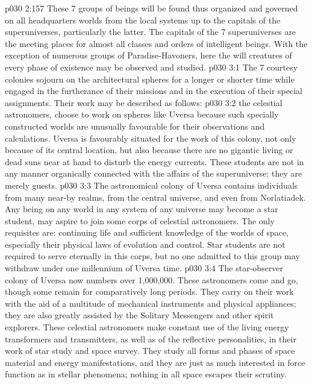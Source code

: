 \vs p030 2:157 \pc These 7 groups of beings will be found thus organized and governed on all headquarters worlds from the local systems up to the capitals of the superuniverses, particularly the latter. The capitals of the 7 superuniverses are the meeting places for almost all classes and orders of intelligent beings. With the exception of numerous groups of Paradise\hyp{}Havoners, here the will creatures of every phase of existence may be observed and studied.
\vs p030 3:1 The 7 courtesy colonies sojourn on the architectural spheres for a longer or shorter time while engaged in the furtherance of their missions and in the execution of their special assignments. Their work may be described as follows:
\vs p030 3:2 \bibnobreakspace {} the celestial astronomers, choose to work on spheres like Uversa because such specially constructed worlds are unusually favourable for their observations and calculations. Uversa is favourably situated for the work of this colony, not only because of its central location, but also because there are no gigantic living or dead suns near at hand to disturb the energy currents. These students are not in any manner organically connected with the affairs of the superuniverse; they are merely guests.
\vs p030 3:3 The astronomical colony of Uversa contains individuals from many near\hyp{}by realms, from the central universe, and even from Norlatiadek. Any being on any world in any system of any universe may become a star student, may aspire to join some corps of celestial astronomers. The only requisites are: continuing life and sufficient knowledge of the worlds of space, especially their physical laws of evolution and control. Star students are not required to serve eternally in this corps, but no one admitted to this group may withdraw under one millennium of Uversa time.
\vs p030 3:4 The star\hyp{}observer colony of Uversa now numbers over 1,000,000. These astronomers come and go, though some remain for comparatively long periods. They carry on their work with the aid of a multitude of mechanical instruments and physical appliances; they are also greatly assisted by the Solitary Messengers and other spirit explorers. These celestial astronomers make constant use of the living energy transformers and transmitters, as well as of the reflective personalities, in their work of star study and space survey. They study all forms and phases of space material and energy manifestations, and they are just as much interested in force function as in stellar phenomena; nothing in all space escapes their scrutiny.
